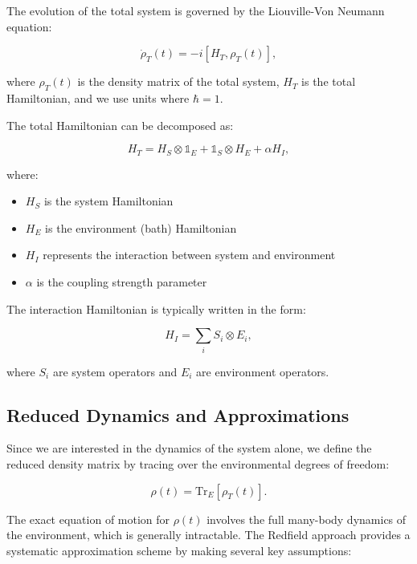 The evolution of the total system is governed by the Liouville-Von Neumann equation:

\begin{equation}
	\dot{\rho}_T(t) = -i[H_T, \rho_T(t)],
	\label{eq:Von_Neumann_Equation}
\end{equation}

where $\rho_T(t)$ is the density matrix of the total system, $H_T$ is the total Hamiltonian, and we use units where $\hbar = 1$.

The total Hamiltonian can be decomposed as:

\begin{equation}
	H_T = H_S \otimes \mathbb{1}_E + \mathbb{1}_S \otimes H_E + \alpha H_I,
	\label{eq:Total_Hamiltonian}
\end{equation}

where:
\begin{itemize}
	\item $H_S$ is the system Hamiltonian
	\item $H_E$ is the environment (bath) Hamiltonian
	\item $H_I$ represents the interaction between system and environment
	\item $\alpha$ is the coupling strength parameter
\end{itemize}

The interaction Hamiltonian is typically written in the form:

\begin{equation}
	H_I = \sum_i S_i \otimes E_i,
	\label{eq:Interaction_Hamiltonian}
\end{equation}

where $S_i$ are system operators and $E_i$ are environment operators.

\subsection{Reduced Dynamics and Approximations}

Since we are interested in the dynamics of the system alone, we define the reduced density matrix by tracing over the environmental degrees of freedom:

\begin{equation}
	\rho(t) = \mathrm{Tr}_E[\rho_T(t)].
	\label{eq:Reduced_Density_Matrix}
\end{equation}

The exact equation of motion for $\rho(t)$ involves the full many-body dynamics of the environment, which is generally intractable. The Redfield approach provides a systematic approximation scheme by making several key assumptions:

